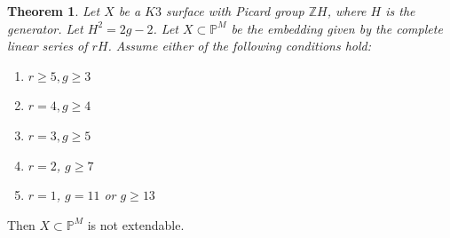 \documentclass[11pt,twoside]{amsart}
\theoremstyle{plain}
\numberwithin{equation}{section}
\newtheorem{theorem}{Theorem}[section]
\theoremstyle{definition}
\begin{document}
\begin{theorem}\label{non-extendability of K3 surfaces}
    Let $X$ be a $K3$ surface with Picard group $\mathbb{Z}H$, where $H$ is the generator. Let $H^2 = 2g-2$. Let $X \subset \mathbb{P}^M$ be the embedding given by the complete linear series of $rH$. Assume either of the following conditions hold:
    \begin{enumerate}
        \item[(1)] $r \geq 5, g \geq 3$
        \item[(2)] $r = 4, g \geq 4$
        \item[(3)] $r = 3, g \geq 5$ 
        \item[(4)] $r = 2$, $g \geq 7$ 
        
        
        
        \item[(5)] $r = 1$, $g = 11$ or $g \geq 13$  
        
    \end{enumerate}
\end{theorem}

Then $X \subset \mathbb{P}^M$ is not extendable.
\end{document}
